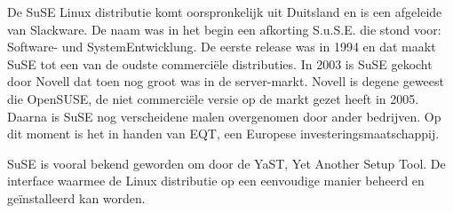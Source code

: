 De SuSE Linux distributie komt oorspronkelijk uit Duitsland en is een afgeleide van Slackware. De naam was in het begin een afkorting S.u.S.E. die stond voor: Software- und SystemEntwicklung. De eerste release was in 1994 en dat maakt SuSE tot een van de oudste commerci\"ele distributies. In 2003 is SuSE gekocht door Novell dat toen nog groot was in de server-markt. Novell is degene geweest die OpenSUSE, de niet commerci\"ele versie op de markt gezet heeft in 2005. Daarna is SuSE nog verscheidene malen overgenomen door ander bedrijven. Op dit moment is het in handen van EQT, een Europese investeringsmaatschappij.

SuSE is vooral bekend geworden om door de YaST, Yet Another Setup Tool. De interface waarmee de Linux distributie op een eenvoudige manier beheerd en ge\"installeerd kan worden.
